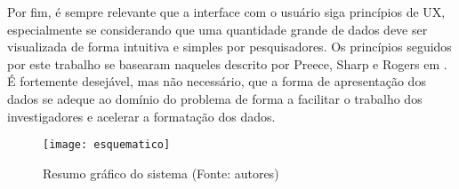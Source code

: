 Por fim, é sempre relevante que a interface com o usuário siga princípios de UX, especialmente se considerando que uma quantidade grande de dados deve ser visualizada de forma intuitiva e simples por pesquisadores. Os princípios seguidos por este trabalho se basearam naqueles descrito por Preece, Sharp e Rogers em \cite{preece}. É fortemente desejável, mas não necessário, que a forma de apresentação dos dados se adeque ao domínio do problema de forma a facilitar o trabalho dos investigadores e acelerar a formatação dos dados.

\begin{figure}[ht]
  \centering
    \texttt{[image: esquematico]}
  \caption{Resumo gráfico do sistema (Fonte: autores)}
\end{figure}
\FloatBarrier
